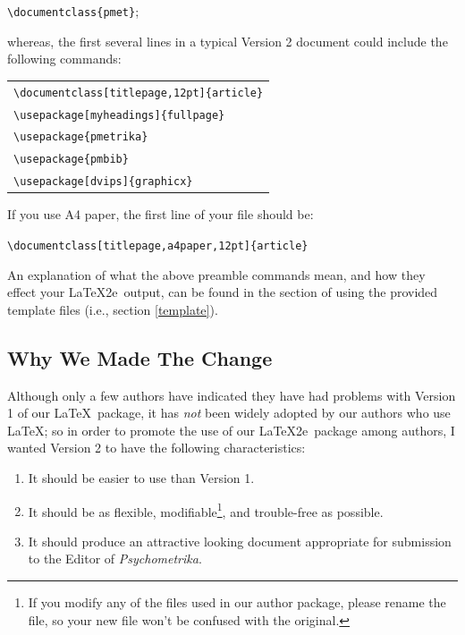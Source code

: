 \documentclass[titlepage,12pt]{article}
\begin{document}
\begin{center}\verb=\documentclass{pmet}=;\end{center}

\noindent whereas, the first several lines in a typical Version 2
document could include the following commands:

{}
\begin{center}
\begin{tabular}{l}
\verb=\documentclass[titlepage,12pt]{article}=  \\
\verb=\usepackage[myheadings]{fullpage}=  \\
\verb=\usepackage{pmetrika}=  \\
\verb=\usepackage{pmbib}=  \\
\verb=\usepackage[dvips]{graphicx}=  \\[1.75ex]
\end{tabular}
\end{center}
{}

\noindent If you use A4 paper, the first line of your file should
be:\par

\begin{center}\verb=\documentclass[titlepage,a4paper,12pt]{article}=\end{center}

\noindent An explanation of what the above preamble commands mean,
and how they effect your \LaTeX2e\ output, can be found in the
section of using the provided template files (i.e., section
\ref{template}).

\shortpage

\subsection{Why We Made The Change}

Although only a few authors have indicated they have had problems
with Version 1 of our \LaTeX\ package, it has \textit{not} been
widely adopted by our authors who use \LaTeX; so in order to
promote the use of our \LaTeX2e\ package among authors, I wanted
Version 2 to have the following characteristics:
\begin{enumerate}
\item It should be easier to use than Version 1.
\item It should be as flexible, modifiable\footnote{If you modify any of
the files used in our author package, please rename the file, so
your new file won't be confused with the original.}, and
trouble-free as possible.
\item It should produce an attractive looking document appropriate for
submission to the Editor of \textit{Psychometrika}.
\end{enumerate}
\end{document}
